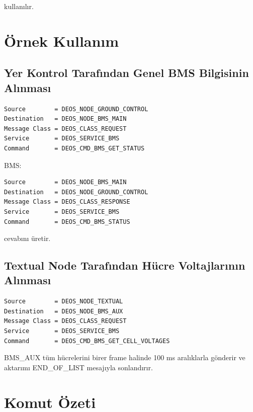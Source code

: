 \documentclass[a4paper,10pt]{article}
\begin{document}
kullanılır.

\section{Örnek Kullanım}

\subsection{Yer Kontrol Tarafından Genel BMS Bilgisinin Alınması}

\begin{lstlisting}
Source        = DEOS_NODE_GROUND_CONTROL
Destination   = DEOS_NODE_BMS_MAIN
Message Class = DEOS_CLASS_REQUEST
Service       = DEOS_SERVICE_BMS
Command       = DEOS_CMD_BMS_GET_STATUS
\end{lstlisting}

BMS:

\begin{lstlisting}
Source        = DEOS_NODE_BMS_MAIN
Destination   = DEOS_NODE_GROUND_CONTROL
Message Class = DEOS_CLASS_RESPONSE
Service       = DEOS_SERVICE_BMS
Command       = DEOS_CMD_BMS_STATUS
\end{lstlisting}

cevabını üretir.

\subsection{Textual Node Tarafından Hücre Voltajlarının Alınması}

\begin{lstlisting}
Source        = DEOS_NODE_TEXTUAL
Destination   = DEOS_NODE_BMS_AUX
Message Class = DEOS_CLASS_REQUEST
Service       = DEOS_SERVICE_BMS
Command       = DEOS_CMD_BMS_GET_CELL_VOLTAGES
\end{lstlisting}

BMS\_AUX tüm hücrelerini birer frame halinde 100 ms aralıklarla
gönderir ve aktarımı END\_OF\_LIST mesajıyla sonlandırır.

\section{Komut Özeti}
\end{document}
